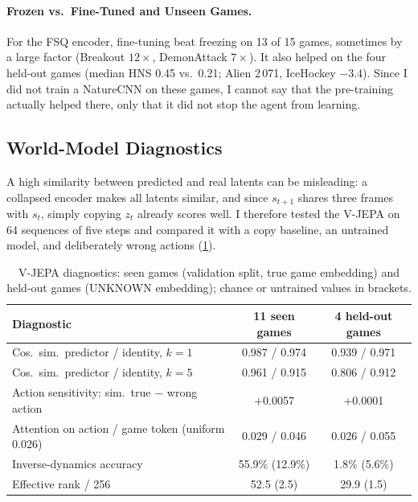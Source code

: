 \documentclass[runningheads]{llncs}
\begin{document}
\paragraph{Frozen vs.\ Fine-Tuned and Unseen Games.} For the FSQ encoder, fine-tuning beat
freezing on 13 of 15 games, sometimes by a large factor (Breakout $12\times$, DemonAttack
$7\times$). It also helped on the four held-out games (median HNS 0.45 vs.\ 0.21; Alien 2\,071,
IceHockey $-3.4$). Since I did not train a NatureCNN on these games, I cannot say that the
pre-training actually helped there, only that it did not stop the agent from learning.

\subsection{World-Model Diagnostics}
\label{sec:jepa-diag}

A high similarity between predicted and real latents can be misleading: a collapsed encoder
makes all latents similar, and since $s_{t+1}$ shares three frames with $s_t$, simply copying
$z_t$ already scores well. I therefore tested the V-JEPA on 64 sequences of five steps
and compared it with a copy baseline, an untrained model, and deliberately wrong actions
(\cref{tab:jepa}).

\begin{table}[t]
\centering
\caption{V-JEPA diagnostics: seen games (validation split, true game embedding) and held-out
games (UNKNOWN embedding); chance or untrained values in brackets.}
\label{tab:jepa}
\footnotesize\setlength{\tabcolsep}{4pt}
\begin{tabular}{@{}lcc@{}}
\toprule
Diagnostic & 11 seen games & 4 held-out games \\
\midrule
Cos.\ sim.\ predictor / identity, $k=1$ & 0.987 / 0.974 & 0.939 / 0.971 \\
Cos.\ sim.\ predictor / identity, $k=5$ & 0.961 / 0.915 & 0.806 / 0.912 \\
Action sensitivity: sim.\ true $-$ wrong action & +0.0057 & +0.0001 \\
Attention on action / game token (uniform 0.026) & 0.029 / 0.046 & 0.026 / 0.055 \\
Inverse-dynamics accuracy & 55.9\% (12.9\%) & 1.8\% (5.6\%) \\
Effective rank / 256 & 52.5 (2.5) & 29.9 (1.5) \\
\bottomrule
\end{tabular}
\end{table}
\end{document}
